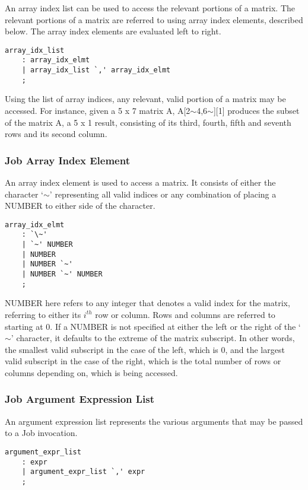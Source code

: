 \documentclass[prodmode,acmtecs]{acmsmall}
\begin{document}
An array index list can be used to access the relevant portions of a matrix. 
The relevant portions of a matrix are referred to using array index elements, 
described below. The array index elements are evaluated left to right.

\begin{lstlisting}
array_idx_list
	: array_idx_elmt
	| array_idx_list `,' array_idx_elmt
	;
\end{lstlisting}

Using the list of array indices, any relevant, valid portion of a matrix may
be accessed. For instance, given a 5 x 7 matrix A, A[2$\sim$4,6$\sim$][1] produces the
subset of the matrix A, a 5 x 1 result, consisting of its third, fourth, 
fifth and seventh rows and its second column.
\medskip

\subsubsection{Job Array Index Element}

An array index element is used to access a matrix. It consists of either 
the character `$\sim$' representing all valid indices or any combination of placing
a NUMBER to either side of the character. 

\begin{lstlisting}
array_idx_elmt
	: `\~'
	| `~' NUMBER
	| NUMBER
	| NUMBER `~'
	| NUMBER `~' NUMBER
	;
\end{lstlisting}

NUMBER here refers to any integer that denotes a valid index for the 
matrix, referring to either its $i^{th}$ row or column. Rows and columns are 
referred to starting at 0. If a NUMBER is not specified at either 
the left or the right of the `$\sim$' character, it defaults to the extreme 
of the matrix subscript. In other words, the smallest valid subscript in 
the case of the left, which is 0, and the largest valid subscript in the 
case of the right, which is the total number of rows or columns depending
on, which is being accessed.
\medskip

\subsubsection{Job Argument Expression List}

An argument expression list represents the various arguments that may be
passed to a Job invocation. 

\begin{lstlisting}
argument_expr_list
	: expr
	| argument_expr_list `,' expr
	;
\end{lstlisting}
\end{document}
